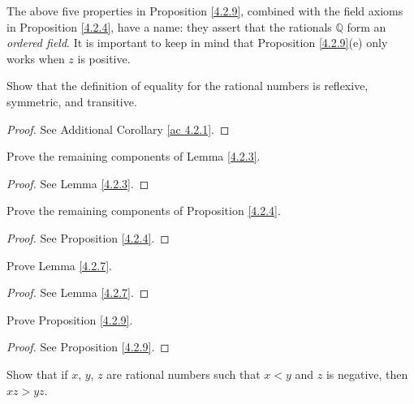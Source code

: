 \begin{remark}\label{4.2.10}
The above five properties in Proposition \ref{4.2.9}, combined with the field axioms in Proposition \ref{4.2.4}, have a name:
they assert that the rationals \(\mathds{Q}\) form an \emph{ordered field}.
It is important to keep in mind that Proposition \ref{4.2.9}(e) only works when \(z\) is positive.
\end{remark}

\exercisesection

\begin{exercise}\label{ex 4.2.1}
Show that the definition of equality for the rational numbers is reflexive, symmetric, and transitive.
\end{exercise}

\begin{proof}
See Additional Corollary \ref{ac 4.2.1}.
\end{proof}

\begin{exercise}\label{ex 4.2.2}
Prove the remaining components of Lemma \ref{4.2.3}.
\end{exercise}

\begin{proof}
See Lemma \ref{4.2.3}.
\end{proof}

\begin{exercise}\label{ex 4.2.3}
Prove the remaining components of Proposition \ref{4.2.4}.
\end{exercise}

\begin{proof}
See Proposition \ref{4.2.4}.
\end{proof}

\begin{exercise}\label{ex 4.2.4}
Prove Lemma \ref{4.2.7}.
\end{exercise}

\begin{proof}
See Lemma \ref{4.2.7}.
\end{proof}

\begin{exercise}\label{ex 4.2.5}
Prove Proposition \ref{4.2.9}.
\end{exercise}

\begin{proof}
See Proposition \ref{4.2.9}.
\end{proof}

\begin{exercise}\label{ex 4.2.6}
Show that if \(x\), \(y\), \(z\) are rational numbers such that \(x < y\) and \(z\) is negative, then \(xz > yz\).
\end{exercise}

